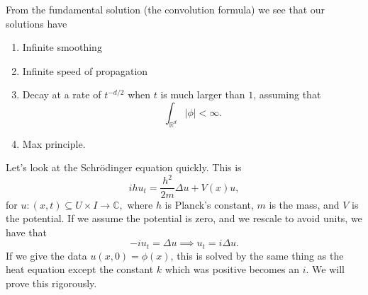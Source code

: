 From the fundamental solution (the convolution formula) we see that our solutions have
\begin{enumerate}

	\item Infinite smoothing
	\item Infinite speed of propagation
	\item Decay at a rate of \( t^{- d/2} \) when \( t \) is much larger than \( 1 \), assuming that
		\[ \int_{\mathbb{R}^{d}} | \phi| < \infty.  \]
	\item Max principle.

\end{enumerate}

Let's look at the Schr\"odinger equation quickly. This is
\[ i h u_{t} = \frac{h^{2}}{2m} \Delta u + V(x) u, \]
for \( u \colon (x, t) \subseteq U \times I \to \mathbb{C}, \) where \( h \) is Planck's constant, \( m \) is the mass, and \( V \) is the potential. If we assume the potential is zero, and we rescale to avoid units, we have that
\[ - i u_{t} = \Delta u \implies u_{t} = i \Delta u. \]
If we give the data \( u(x, 0) = \phi(x) \), this is solved by the same thing as the heat equation except the constant \( k \) which was positive becomes an \( i \). We will prove this rigorously.

